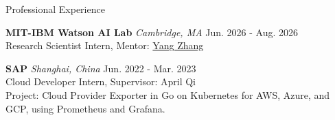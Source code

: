 
\begin{rSection}{Professional Experience}

    
  \small{
{\bf MIT-IBM Watson AI Lab} \textit{Cambridge, MA} \hfill Jun. 2026 - Aug. 2026
\\ Research Scientist Intern, Mentor: \href{https://mitibm.mit.edu/people/yang-zhang/}{\textcolor{BS_color}{Yang Zhang}}
}

  \small{
{\bf SAP} \textit{Shanghai, China} \hfill Jun. 2022 - Mar. 2023
\\ Cloud Developer Intern, Supervisor: April Qi
\\
Project: Cloud Provider Exporter in Go on Kubernetes for AWS, Azure, and GCP, using Prometheus and Grafana.
}
\vspace{-2mm}

\end{rSection}
    
    